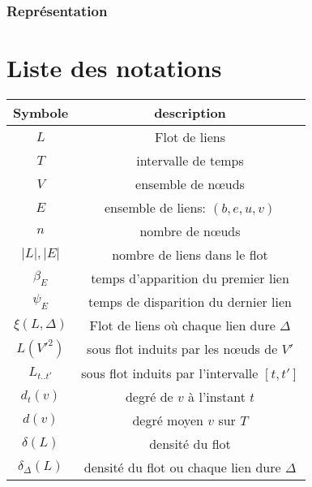 \subsection{Représentation}

\chapter*{Liste des notations}


\begin{center}
\begin{tabular}{|c|c|}
\hline Symbole & description \\
\hline $L$ & Flot de liens \\ 
$T$ & intervalle de temps  \\
$V$ & ensemble de n\oe uds\\
$E$ & ensemble de liens: $(b,e,u,v)$ \\
$n$ & nombre de n\oe uds  \\
$|L|,|E|$ & nombre de liens dans le flot \\
$\beta_E$ & temps d'apparition du premier lien\\
$\psi_E$ & temps de disparition du dernier lien\\
$\xi(L,\Delta)$ & Flot de liens où chaque lien dure $\Delta$\\
$L(V'^2)$ & sous flot induits par les n\oe uds de $V'$ \\
$L_{t..t'}$ & sous flot induits par l'intervalle $[t,t']$ \\
$d_t(v)$ & degré de $v$ à l'instant $t$\\
$d(v)$ & degré moyen $v$ sur $T$\\
$\delta(L)$ & densité du flot\\
$\delta_{\Delta}(L)$ & densité du flot ou chaque lien dure $\Delta$\\

\hline
\end{tabular} 
\end{center}

